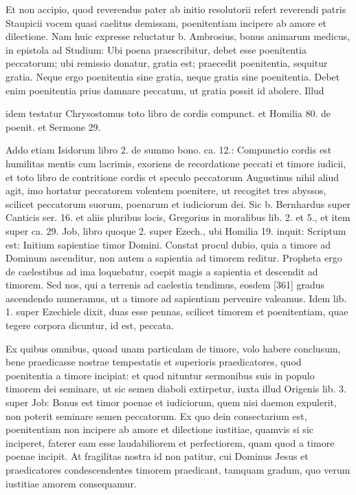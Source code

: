Et non accipio, quod reverendus pater ab initio resolutorii refert reverendi patris Staupicii vocem quasi caelitus demissam, poenitentiam incipere ab amore et dilectione. Nam huic expresse reluctatur b. Ambrosius, bonus animarum medicus, in epistola ad Studium: Ubi poena praescribitur, debet esse poenitentia peccatorum; ubi remissio donatur, gratia est; praecedit poenitentia, sequitur gratia. Neque ergo poenitentia sine gratia, neque gratia sine poenitentia. Debet enim poenitentia prius damnare peccatum, ut gratia possit id abolere. Illud

idem testatur Chrysostomus toto libro de cordis compunct. et Homilia 80. de poenit. et Sermone 29.

Addo etiam Isidorum libro 2. de summo bono. ca. 12.: Compunctio cordis est humilitas mentis cum lacrimis, exoriens de recordatione peccati et timore iudicii, et toto libro de contritione cordis et speculo peccatorum Augustinus nihil aliud agit, imo hortatur peccatorem volentem poenitere, ut recogitet tres abyssos, scilicet peccatorum suorum, poenarum et iudiciorum dei. Sic b. Bernhardus super Canticis ser. 16. et aliis pluribus locis, Gregorius in moralibus lib. 2. et 5., et item super ca. 29. Job, libro quoque 2. super Ezech., ubi Homilia 19. inquit: Scriptum est: Initium sapientiae timor Domini. Constat procul dubio, quia a timore ad Dominum ascenditur, non autem a sapientia ad timorem reditur. Propheta ergo de caelestibus ad ima loquebatur, coepit magis a sapientia et descendit ad timorem. Sed nos, qui a terrenis ad caelestia tendimus, eosdem [361] gradus ascendendo numeramus, ut a timore ad sapientiam pervenire valeamus. Idem lib. 1. super Ezechiele dixit, duas esse pennas, scilicet timorem et poenitentiam, quae tegere corpora dicuntur, id est, peccata.

Ex quibus omnibus, quoad unam particulam de timore, volo habere conclusum, bene praedicasse nostrae tempestatis et superioris praedicatores, quod poenitentia a timore incipiat: et quod nituntur sermonibus suis in populo timorem dei seminare, ut sic semen diaboli extirpetur, iuxta illud Origenis lib. 3. super Job: Bonus est timor poenae et iudiciorum, quem nisi daemon expulerit, non poterit seminare semen peccatorum. Ex quo dein consectarium est, poenitentiam non incipere ab amore et dilectione iustitiae, quamvis si sic inciperet, faterer eam esse laudabiliorem et perfectiorem, quam quod a timore poenae incipit. At fragilitas nostra id non patitur, cui Dominus Jesus et praedicatores condescendentes timorem praedicant, tamquam gradum, quo verum iustitiae amorem consequamur.

